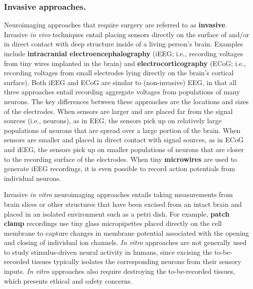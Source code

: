 \documentclass{llmxive}
\begin{document}
\subsubsection{Invasive approaches.}
Neuroimaging approaches that require surgery are referred to as
\textbf{invasive}.  Invasive \textit{in vivo} techniques entail
placing sensors directly on the surface of and/or in direct contact
with deep structure inside of a living person's brain.  Examples
include \textbf{intracranial electroencephalography} (iEEG; i.e.,
recording voltages from tiny wires implanted in the brain) and
\textbf{electrocorticography} (ECoG; i.e., recording voltages from
small electrodes lying directly on the brain's cortical surface).
Both iEEG and ECoG are similar to (non-invasive) EEG, in that all
three approaches entail recording aggregate voltages from populations
of many neurons.  The key differences between these approaches are the
locations and sizes of the electrodes.  When sensors are larger and
are placed far from the signal sources (i.e., neurons), as in EEG, the
sensors pick up on relatively large populations of neurons that are
spread over a large portion of the brain.  When sensors are smaller
and placed in direct contact with signal sources, as in ECoG and iEEG,
the sensors pick up on smaller populations of neurons that are closer
to the recording surface of the electrodes.  When tiny
\textbf{microwires} are used to generate iEEG recordings, it is even
possible to record action potentials from individual neurons.

Invasive \textit{in vitro} neuroimaging approaches entails taking
measurements from brain slices or other structures that have been
excised from an intact brain and placed in an isolated environment
such as a petri dish.  For example, \textbf{patch clamp} recordings
use tiny glass micropipettes placed directly on the cell membrane to
capture changes in membrane potential associated with the opening and
closing of individual ion channels.  \textit{In vitro} approaches are
not generally used to study stimulus-driven neural activity in humans,
since excising the to-be-recorded tissues typically isolates the
corresponding neurons from their sensory inputs.  \textit{In vitro}
approaches also require destroying the to-be-recorded tissues, which
presents ethical and safety concerns.
\end{document}
